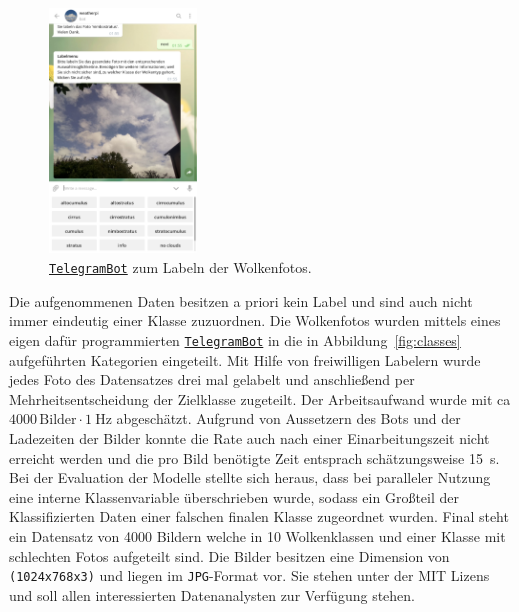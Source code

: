 \begin{figure}
		\vspace{-1.4cm}
		\centering
		\includegraphics[width=0.35\textwidth]{pictures/telegram.pdf}
		\caption{\href{https://telegram.me/weatherpi_bot}{\texttt{TelegramBot}} zum Labeln der Wolkenfotos.}
		\label{fig:}
		\vspace{-1.0cm}
\end{figure}
Die aufgenommenen Daten besitzen a priori kein Label und sind auch nicht immer
eindeutig einer Klasse zuzuordnen.
Die Wolkenfotos wurden mittels eines eigen dafür programmierten
\href{https://telegram.me/weatherpi_bot}{\texttt{TelegramBot}} in
die in Abbildung~\ref{fig:classes} aufgeführten Kategorien eingeteilt.
Mit Hilfe von freiwilligen Labelern wurde jedes Foto des Datensatzes drei mal
gelabelt und anschließend per Mehrheitsentscheidung der Zielklasse 
zugeteilt.
Der Arbeitsaufwand wurde mit ca $\num{4000} \, \text{Bilder} \cdot \SI{1}{\hertz}$
abgeschätzt.
Aufgrund von Aussetzern des Bots und der Ladezeiten der Bilder konnte die Rate
auch nach einer Einarbeitungszeit nicht erreicht werden und die pro Bild benötigte Zeit entsprach schätzungsweise
\SI{15}{\second}.
Bei der Evaluation der Modelle stellte sich heraus, dass bei paralleler Nutzung
eine interne Klassenvariable überschrieben wurde, sodass ein Großteil der
Klassifizierten Daten einer falschen finalen Klasse zugeordnet wurden. 
Final steht ein Datensatz von \num{4000} Bildern welche in 10 Wolkenklassen und
einer Klasse mit schlechten Fotos aufgeteilt sind. Die Bilder besitzen eine Dimension 
von \texttt{(1024x768x3)} und liegen im \texttt{JPG}-Format vor.
Sie stehen unter der MIT Lizens und soll allen interessierten 
Datenanalysten zur Verfügung stehen.

